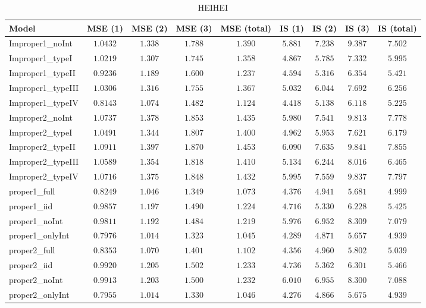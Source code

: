 \begin{table}

\caption{\label{tab:model-choice-sc4}HEIHEI}
\centering
\begin{tabular}{lcccccccc}
\hline
Model  & MSE (1) & MSE (2) & MSE (3) & MSE (total) & IS (1) & IS (2) & IS (3) & \multicolumn{1}{c}{IS (total)} \\ 
\hline
Improper1_noInt  & $1.0432$ & $1.338$ & $1.788$ & $1.390$ & $5.881$ & $7.238$ & $9.387$ & $7.502$ \\
Improper1_typeI  & $1.0219$ & $1.307$ & $1.745$ & $1.358$ & $4.867$ & $5.785$ & $7.332$ & $5.995$ \\
Improper1_typeII  & $0.9236$ & $1.189$ & $1.600$ & $1.237$ & $4.594$ & $5.316$ & $6.354$ & $5.421$ \\
Improper1_typeIII  & $1.0306$ & $1.316$ & $1.755$ & $1.367$ & $5.032$ & $6.044$ & $7.692$ & $6.256$ \\
Improper1_typeIV  & $0.8143$ & $1.074$ & $1.482$ & $1.124$ & $4.418$ & $5.138$ & $6.118$ & $5.225$ \\
Improper2_noInt  & $1.0737$ & $1.378$ & $1.853$ & $1.435$ & $5.980$ & $7.541$ & $9.813$ & $7.778$ \\
Improper2_typeI  & $1.0491$ & $1.344$ & $1.807$ & $1.400$ & $4.962$ & $5.953$ & $7.621$ & $6.179$ \\
Improper2_typeII  & $1.0911$ & $1.397$ & $1.870$ & $1.453$ & $6.090$ & $7.635$ & $9.841$ & $7.855$ \\
Improper2_typeIII  & $1.0589$ & $1.354$ & $1.818$ & $1.410$ & $5.134$ & $6.244$ & $8.016$ & $6.465$ \\
Improper2_typeIV  & $1.0716$ & $1.375$ & $1.848$ & $1.432$ & $5.995$ & $7.559$ & $9.837$ & $7.797$ \\
proper1_full  & $0.8249$ & $1.046$ & $1.349$ & $1.073$ & $4.376$ & $4.941$ & $5.681$ & $4.999$ \\
proper1_iid  & $0.9857$ & $1.197$ & $1.490$ & $1.224$ & $4.716$ & $5.330$ & $6.228$ & $5.425$ \\
proper1_noInt  & $0.9811$ & $1.192$ & $1.484$ & $1.219$ & $5.976$ & $6.952$ & $8.309$ & $7.079$ \\
proper1_onlyInt  & $0.7976$ & $1.014$ & $1.323$ & $1.045$ & $4.289$ & $4.871$ & $5.657$ & $4.939$ \\
proper2_full  & $0.8353$ & $1.070$ & $1.401$ & $1.102$ & $4.356$ & $4.960$ & $5.802$ & $5.039$ \\
proper2_iid  & $0.9920$ & $1.205$ & $1.502$ & $1.233$ & $4.736$ & $5.362$ & $6.301$ & $5.466$ \\
proper2_noInt  & $0.9913$ & $1.203$ & $1.500$ & $1.232$ & $6.010$ & $6.955$ & $8.300$ & $7.088$ \\
proper2_onlyInt  & $0.7955$ & $1.014$ & $1.330$ & $1.046$ & $4.276$ & $4.866$ & $5.675$ & $4.939$ \\
\hline 
\end{tabular}


\end{table}